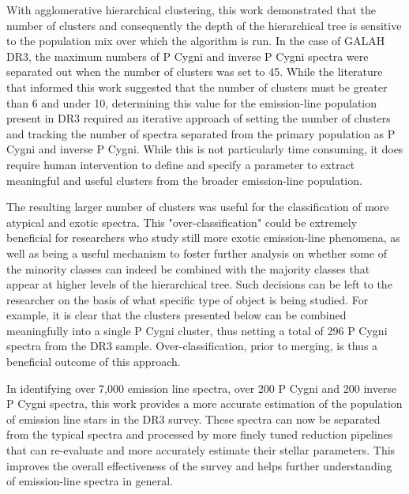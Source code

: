 With agglomerative hierarchical clustering, this work demonstrated that the number of clusters and consequently the depth of the hierarchical tree is sensitive to the population mix over which the algorithm is run. In the case of GALAH DR3, the maximum numbers of P Cygni and inverse P Cygni spectra were separated out when the number of clusters was set to 45. While the literature that informed this work suggested that the number of clusters must be greater than 6 and under 10, determining this value for the emission-line population present in DR3 required an iterative approach of setting the number of clusters and tracking the number of spectra separated from the primary population as P Cygni and inverse P Cygni. While this is not particularly time consuming, it does require human intervention to define and specify a parameter to extract meaningful and useful clusters from the broader emission-line population. 

The resulting larger number of clusters was useful for the classification of more atypical and exotic spectra. This "over-classification" could be extremely beneficial for researchers who study still more exotic emission-line phenomena, as well as being a useful mechanism to foster further analysis on whether some of the minority classes can indeed be combined with the majority classes that appear at higher levels of the hierarchical tree. Such decisions can be left to the researcher on the basis of what specific type of object is being studied. For example, it is clear that the clusters presented below can be combined meaningfully into a single P Cygni cluster, thus netting a total of 296 P Cygni spectra from the DR3 sample. Over-classification, prior to merging, is thus a beneficial outcome of this approach. 

In identifying over 7,000 emission line spectra, over 200 P Cygni and 200 inverse P Cygni spectra, this work provides a more accurate estimation of the population of emission line stars in the DR3 survey. These spectra can now be separated from the typical spectra and processed by more finely tuned reduction pipelines that can re-evaluate and more accurately estimate their stellar parameters. This improves the overall effectiveness of the survey and helps further understanding of emission-line spectra in general. 

